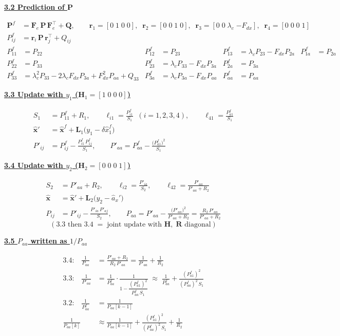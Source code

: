 \documentclass[11pt,a4paper]{ctexart}
\newcommand{\lc}{\lambda_c}
\newcommand{\hd}[1]{\par\medskip\noindent\underline{\textbf{#1}}\par\nobreak\vspace{0.2ex}}
\begin{document}
\hd{3.2 Prediction of $\mathbf{P}$}
\[
\begin{aligned}
\mathbf{P}^f &= \mathbf{F}_e\,\mathbf{P}\,\mathbf{F}_e^{\top} + \mathbf{Q}, \qquad
\mathbf{r}_1 = [0\;1\;0\;0],\;\; \mathbf{r}_2 = [0\;0\;1\;0],\;\; \mathbf{r}_3 = [0\;0\;\lc\;{-F_{dx}}],\;\; \mathbf{r}_4 = [0\;0\;0\;1] \\
P^f_{ij} &= \mathbf{r}_i\,\mathbf{P}\,\mathbf{r}_j^{\top} + Q_{ij}
\end{aligned}
\]
\[
\begin{aligned}
P^f_{11} &= P_{22} & P^f_{12} &= P_{23} & P^f_{13} &= \lc P_{23} - F_{dx} P_{2a} & P^f_{1a} &= P_{2a} \\
P^f_{22} &= P_{33} & P^f_{23} &= \lc P_{33} - F_{dx} P_{3a} & P^f_{2a} &= P_{3a} & & \\
P^f_{33} &= \lc^2 P_{33} - 2\lc F_{dx} P_{3a} + F_{dx}^2 P_{aa} + Q_{33} & P^f_{3a} &= \lc P_{3a} - F_{dx} P_{aa} & P^f_{aa} &= P_{aa} & &
\end{aligned}
\]

\hd{3.3 Update with $y_1$ ($\mathbf{H}_1 = [1\;0\;0\;0]$)}
\[
\begin{aligned}
S_1 &= P^f_{11} + R_1, \qquad \ell_{i1} = \frac{P^f_{i1}}{S_1}\;\;(i = 1,2,3,4), \qquad \ell_{41} = \frac{P^f_{a1}}{S_1} \\
\hat{\mathbf{x}}' &= \hat{\mathbf{x}}^f + \mathbf{L}_1\big(y_1 - \delta\hat x_1^f\big) \\
P'_{ij} &= P^f_{ij} - \frac{P^f_{i1}\,P^f_{1j}}{S_1}, \qquad
P'_{aa} = P^f_{aa} - \frac{\big(P^f_{a1}\big)^2}{S_1}
\end{aligned}
\]

\hd{3.4 Update with $y_2$ ($\mathbf{H}_2 = [0\;0\;0\;1]$)}
\[
\begin{aligned}
S_2 &= P'_{aa} + R_2, \qquad \ell_{i2} = \frac{P'_{ia}}{S_2}, \qquad \ell_{42} = \frac{P'_{aa}}{P'_{aa} + R_2} \\
\hat{\mathbf{x}} &= \hat{\mathbf{x}}' + \mathbf{L}_2\big(y_2 - \hat a_x'\big) \\
P_{ij} &= P'_{ij} - \frac{P'_{ia}\,P'_{aj}}{S_2}, \qquad
P_{aa} = P'_{aa} - \frac{\big(P'_{aa}\big)^2}{P'_{aa} + R_2} = \frac{R_2\,P'_{aa}}{P'_{aa} + R_2}
\end{aligned}
\]
\[
(\text{3.3 then 3.4} \;=\; \text{joint update with } \mathbf{H}, \; \mathbf{R} \text{ diagonal})
\]

\hd{3.5 $P_{aa}$ written as $1/P_{aa}$}
\[
\begin{aligned}
\text{3.4:}\quad \frac{1}{P_{aa}} &= \frac{P'_{aa} + R_2}{R_2\,P'_{aa}} = \frac{1}{P'_{aa}} + \frac{1}{R_2} \\
\text{3.3:}\quad \frac{1}{P'_{aa}} &= \frac{1}{P^f_{aa}}\cdot\frac{1}{1 - \dfrac{(P^f_{a1})^2}{P^f_{aa}\,S_1}}
\;\approx\; \frac{1}{P^f_{aa}} + \frac{(P^f_{a1})^2}{(P^f_{aa})^2\,S_1} \\
\text{3.2:}\quad \frac{1}{P^f_{aa}} &= \frac{1}{P_{aa}[k-1]} \\
\frac{1}{P_{aa}[k]} &\approx \frac{1}{P_{aa}[k-1]} + \frac{(P^f_{a1})^2}{(P^f_{aa})^2\,S_1} + \frac{1}{R_2}
\end{aligned}
\]
\end{document}
